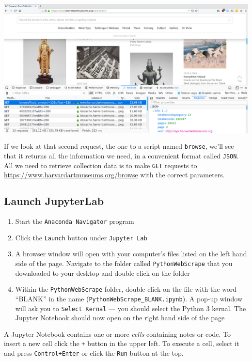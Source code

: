 \documentclass[]{book}
\providecommand{\tightlist}{%
  \setlength{\itemsep}{0pt}\setlength{\parskip}{0pt}}
\begin{document}
\includegraphics{Python/PythonWebScrape/images/dev_tools_network.png}

If we look at that second request, the one to a script named \texttt{browse}, we'll see that it returns all the information we need, in a convenient format called \texttt{JSON}. All we need to retrieve collection data is to make \texttt{GET} requests to \url{https://www.harvardartmuseums.org/browse} with the correct parameters.

\hypertarget{launch-jupyterlab-2}{%
\subsection{Launch JupyterLab}\label{launch-jupyterlab-2}}

\begin{enumerate}
\def\labelenumi{\arabic{enumi}.}
\tightlist
\item
  Start the \texttt{Anaconda\ Navigator} program
\item
  Click the \texttt{Launch} button under \texttt{Jupyter\ Lab}
\item
  A browser window will open with your computer's files listed on the left hand side of the page. Navigate to the folder called \texttt{PythonWebScrape} that you downloaded to your desktop and double-click on the folder
\item
  Within the \texttt{PythonWebScrape} folder, double-click on the file with the word ``BLANK'' in the name (\texttt{PythonWebScrape\_BLANK.ipynb}). A pop-up window will ask you to \texttt{Select\ Kernal} --- you should select the Python 3 kernal. The Jupyter Notebook should now open on the right hand side of the page
\end{enumerate}

A Jupyter Notebook contains one or more \emph{cells} containing notes or code. To insert a new cell click the \texttt{+} button in the upper left. To execute a cell, select it and press \texttt{Control+Enter} or click the \texttt{Run} button at the top.
\end{document}
